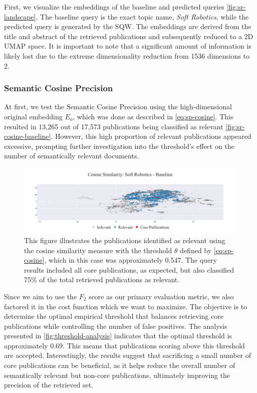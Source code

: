 First, we visualize the embeddings of the baseline and predicted queries \autoref{fig:sr-landscape}. The baseline query is the exact topic name, \textit{Soft Robotics}, while the predicted query is generated by the SQW. The embeddings are derived from the title and abstract of the retrieved publications and subsequently reduced to a 2D UMAP \autocite{mcinnes2020umap} space. It is important to note that a significant amount of information is likely lost due to the extreme dimensionality reduction from 1536 dimensions to 2.

\subsubsection{Semantic Cosine Precision}

At first, we test the Semantic Cosine Precision using the high-dimensional original embedding $E_o$, which was done as described in \autoref{eq:sp-cosine}. This resulted in 13,265 out of 17,573 publications being classified as relevant \autoref{fig:sr-cosine-baseline}. However, this high proportion of relevant publications appeared excessive, prompting further investigation into the threshold's effect on the number of semantically relevant documents.

\begin{figure}[!ht]
	\hspace*{-1cm}	
	\includegraphics[scale=0.45]{pics/sr-cosine-baseline.pdf}
	\caption[Semantic Cosine Similarity: Soft Robotics]{This figure illustrates the publications identified as relevant using the cosine similarity measure with the threshold $\theta$ defined by \autoref{eq:sp-cosine}, which in this case was approximately 0.547. The query results included all core publications, as expected, but also classified 75\% of the total retrieved publications as relevant.}\label{fig:sr-cosine-baseline}
\end{figure}

Since we aim to use the $F_2$ score as our primary evaluation metric, we also factored it in the cost function which we want to maximize. The objective is to determine the optimal empirical threshold that balances retrieving core publications while controlling the number of false positives. The analysis presented in \autoref{fig:threshold-analysis} indicates that the optimal threshold is approximately 0.69. This means that publications scoring above this threshold are accepted. Interestingly, the results suggest that sacrificing a small number of core publications can be beneficial, as it helps reduce the overall number of semantically relevant but non-core publications, ultimately improving the precision of the retrieved set.

